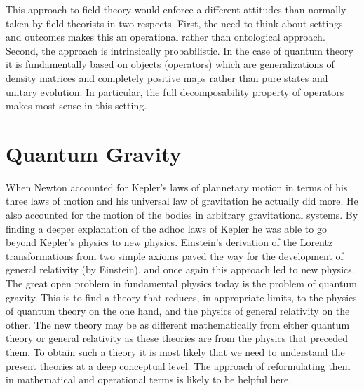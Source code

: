\documentclass[10pt]{article}
\begin{document}
This approach to field theory would enforce a different attitudes than normally taken by field theorists in two respects.  First, the need to think about settings and outcomes makes this an operational rather than ontological approach.  Second, the approach is intrinsically probabilistic.  In the case of quantum theory it is fundamentally based on objects (operators) which are generalizations of density matrices and completely positive maps rather than pure states and unitary evolution.  In particular, the full decomposability property of operators makes most sense in this setting.



\section{Quantum Gravity}\label{quantumgravity}

When Newton accounted for Kepler's laws of plannetary motion in terms of his three laws of motion and his universal law of gravitation he actually did more.  He also accounted for the motion of the bodies in arbitrary gravitational systems.  By finding a deeper explanation of the adhoc laws of Kepler he was able to go beyond Kepler's physics to new physics.  Einstein's derivation of the Lorentz transformations from two simple axioms paved the way for the development of general relativity (by Einstein), and once again this approach led to new physics.   The great open problem in fundamental physics today is the problem of quantum gravity.  This is to find a theory that reduces, in appropriate limits, to the physics of quantum theory on the one hand, and the physics of general relativity on the other.  The new theory may be as different mathematically from either quantum theory or general relativity as these theories are from the physics that preceded them.   To obtain such a theory it is most likely that we need to understand the present theories at a deep conceptual level.  The approach of reformulating them in mathematical and operational terms is likely to be helpful here.
\end{document}
